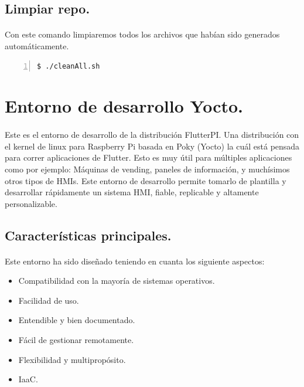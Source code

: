 \subsection{Limpiar repo.}

\paragraph{}Con este comando limpiaremos todos los archivos que habían sido generados
automáticamente.

\begin{lstlisting}[style=consola, numbers=left]
    $ ./cleanAll.sh
\end{lstlisting}


\section{Entorno de desarrollo Yocto.}

\paragraph{}Este es el entorno de desarrollo de la distribución FlutterPI. Una distribución
con el kernel de linux para Raspberry Pi basada en Poky (Yocto) la cuál está pensada
para correr aplicaciones de Flutter. Esto es muy útil para múltiples aplicaciones como
por ejemplo: Máquinas de vending, paneles de información, y muchísimos otros tipos de
HMIs. Este entorno de desarrollo permite tomarlo de plantilla y desarrollar rápidamente
un sistema HMI, fiable, replicable y altamente personalizable.

\subsection{Características principales.}

\paragraph{}Este entorno ha sido diseñado teniendo en cuanta los siguiente aspectos:

\begin{itemize}
    \item Compatibilidad con la mayoría de sistemas operativos.
    \item Facilidad de uso.
    \item Entendible y bien documentado.
    \item Fácil de gestionar remotamente.
    \item Flexibilidad y multipropósito.
    \item \gls{IaaC}.
\end{itemize}

